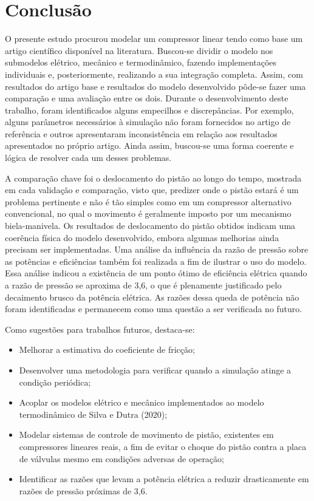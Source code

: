 \chapter{Conclusão}

O presente estudo procurou modelar um compressor linear tendo como base um artigo científico disponível na literatura. Buscou-se dividir o modelo nos submodelos elétrico, mecânico e termodinâmico, fazendo implementações individuais e, posteriormente, realizando a sua integração completa. Assim, com resultados do artigo base e resultados do modelo desenvolvido pôde-se fazer uma comparação e uma avaliação entre os dois.
Durante o desenvolvimento deste trabalho, foram identificados alguns empecilhos e discrepâncias. Por exemplo, alguns parâmetros necessários à simulação não foram fornecidos no artigo de referência e outros apresentaram inconsistência em relação aos resultados apresentados no próprio artigo. Ainda assim, buscou-se uma forma coerente e lógica de resolver cada um desses problemas.

A comparação chave foi o deslocamento do pistão ao longo do tempo, mostrada em cada validação e comparação, visto que, predizer onde o pistão estará é um problema pertinente e não é tão simples como em um compressor alternativo convencional, no qual o movimento é geralmente imposto por um mecanismo biela-manivela. Os resultados de deslocamento do pistão obtidos indicam uma coerência física do modelo desenvolvido, embora algumas melhorias ainda precisam ser implementadas. Uma análise da influência da razão de pressão sobre as potências e eficiências também foi realizada a fim de ilustrar o uso do modelo. Essa análise indicou a existência de um ponto ótimo de eficiência elétrica quando a razão de pressão se aproxima de 3,6, o que é plenamente justificado pelo decaimento brusco da potência elétrica. As razões dessa queda de potência não foram identificadas e permanecem como uma questão a ser verificada no futuro.

Como sugestões para trabalhos futuros, destaca-se:
\begin{itemize}
    \item Melhorar a estimativa do coeficiente de fricção;
    \item Desenvolver uma metodologia para verificar quando a simulação atinge a condição periódica;
    \item Acoplar os modelos elétrico e mecânico implementados ao modelo termodinâmico de Silva e Dutra (2020);
    \item Modelar sistemas de controle de movimento de pistão, existentes em compressores lineares reais, a fim de evitar o choque do pistão contra a placa de válvulas mesmo em condições adversas de operação;
    \item Identificar as razões que levam a potência elétrica a reduzir drasticamente em razões de pressão próximas de 3,6.
\end{itemize}

